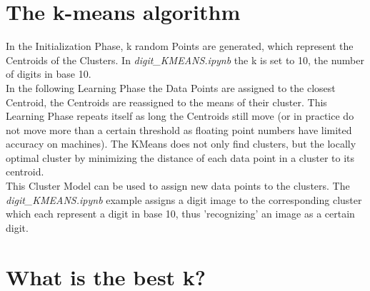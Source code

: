 \documentclass[a4paper, 11pt]{article}
\begin{document}
\section{The k-means algorithm}
In the Initialization Phase, k random Points are generated, which represent the Centroids of the Clusters. In \textit{digit\_KMEANS.ipynb} the k is set to 10, the number of digits in base 10.\\
In the following Learning Phase the Data Points are assigned to the closest Centroid, the Centroids are reassigned to the means of their cluster. This Learning Phase repeats itself as long the Centroids still move (or in practice do not move more than a certain threshold as floating point numbers have limited accuracy on machines).
The KMeans does not only find clusters, but the locally optimal cluster by minimizing the distance of each data point in a cluster to its centroid.\\
This Cluster Model can be used to assign new data points to the clusters. The \textit{digit\_KMEANS.ipynb} example assigns a digit image to the corresponding cluster which each represent a digit in base 10, thus 'recognizing' an image as a certain digit.
\section{What is the best k?}
\end{document}
